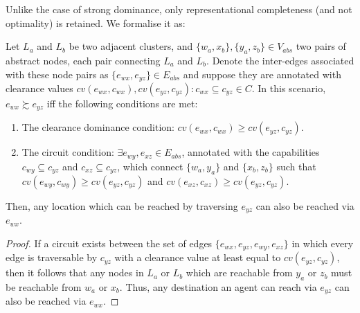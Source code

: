Unlike the case of strong dominance, only representational completeness (and not optimality) is retained. 
We formalise it as:
\begin{theorem}
\label{aha-theorem:weakdominance}
Let $L_{a}$ and $L_{b}$ be two adjacent clusters, and $\lbrace w_{a}, x_{b} \rbrace, \lbrace y_{a}, z_{b} \rbrace \in V_{abs}$ two pairs of abstract nodes, each pair connecting $L_{a}$ and $L_{b}$.
Denote the inter-edges associated with these node pairs as $\lbrace e_{wx}, e_{yz} \rbrace \in E_{abs}$ and suppose they are annotated with clearance values $cv(e_{wx}, c_{wx}), cv(e_{yz}, c_{yz}) : c_{wx} \subseteq c_{yz} \in C$.
 In this scenario, $e_{wx} \succsim e_{yz}$ iff the following conditions are met:
\begin{enumerate}
\item{The clearance dominance condition: $cv(e_{wx}, c_{wx}) \geq cv(e_{yz}, c_{yz})$}.
\item{The circuit condition: $\exists e_{wy}, e_{xz} \in E_{abs}$, annotated with the capabilities $c_{wy} \subseteq c_{yz}$ and $c_{xz} \subseteq c_{yz}$,
which connect $\lbrace w_{a}, y_{a} \rbrace$ and $\lbrace x_{b}, z_{b} \rbrace$ such that $cv(e_{wy}, c_{wy}) \geq cv(e_{yz}, c_{yz})$ and $cv(e_{xz}, c_{xz}) \geq cv(e_{yz}, c_{yz})$.}
\end{enumerate}
Then, any location which can be reached by traversing $e_{yz}$ can also be reached via $e_{wx}$.
\end{theorem}

\begin{proof}
If a circuit exists between the set of edges $\lbrace e_{wx}, e_{yz}, e_{wy}, e_{xz} \rbrace$ in which every edge is traversable by $c_{yz}$ with a clearance value at least equal to $cv(e_{yz}, c_{yz})$, then it follows that any nodes in $L_{a}$ or $L_{b}$ which are reachable from $y_{a}$ or $z_{b}$ must be reachable from $w_{a}$ or $x_{b}$.
Thus, any destination an agent can reach via $e_{yz}$ can also be reached via $e_{wx}$. 
\end{proof}

